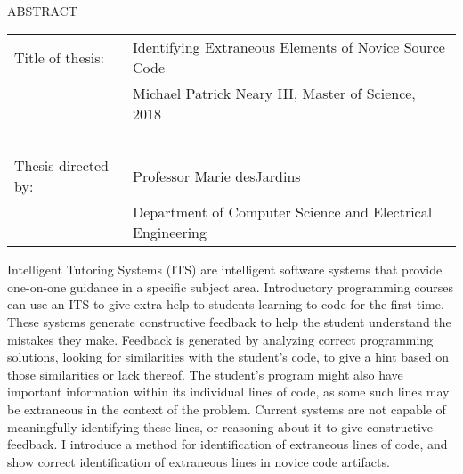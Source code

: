 
\hbox{\ }

\renewcommand{\baselinestretch}{1}
\small \normalsize

\begin{center}
\large{{ABSTRACT}} 

\vspace{3em} 

\end{center}
\hspace{-.15in}
\begin{tabular}{ll}
Title of thesis:    & {\large Identifying Extraneous Elements of Novice Source Code}
\ \\
&                          {\large Michael Patrick Neary III, Master of Science, 2018} \\
\ \\
Thesis directed by: & {\large  Professor Marie desJardins} \\
&  				{\large	 Department of Computer Science and Electrical Engineering} \\
\end{tabular}

\vspace{3em}

\renewcommand{\baselinestretch}{2}
\large \normalsize

Intelligent Tutoring Systems (ITS) are intelligent software systems that provide one-on-one guidance in a specific subject area. Introductory programming courses can use an ITS to give extra help to students learning to code for the first time. These systems generate constructive feedback to help the student understand the mistakes they make. Feedback is generated by analyzing correct programming solutions, looking for similarities with the student's code, to give a hint based on those similarities or lack thereof. The student's program might also have important information within its individual lines of code, as some such lines may be extraneous in the context of the problem. Current systems are not capable of meaningfully identifying these lines, or reasoning about it to give constructive feedback. I introduce a method for identification of extraneous lines of code, and show correct identification of extraneous lines in novice code artifacts.

